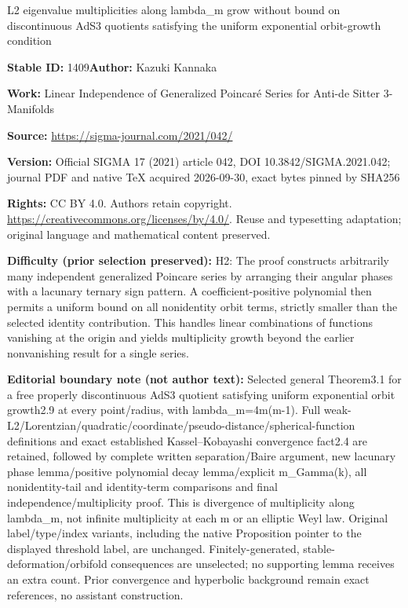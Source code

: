 \documentclass[11pt]{article}
\numberwithin{equation}{section}
\numberwithin{equation}{section}
\begin{document}
\begin{center}\Large L2 eigenvalue multiplicities along lambda\_m grow without bound on discontinuous AdS3 quotients satisfying the uniform exponential orbit-growth condition\end{center}
\noindent\textbf{Stable ID:} 1409\quad\textbf{Author:} Kazuki Kannaka\par
\noindent\textbf{Work:} Linear Independence of Generalized Poincaré Series for Anti-de Sitter 3-Manifolds\par
\noindent\textbf{Source:} \url{https://sigma-journal.com/2021/042/}\par
\noindent\textbf{Version:} Official SIGMA 17 (2021) article 042, DOI 10.3842/SIGMA.2021.042; journal PDF and native TeX acquired 2026-09-30, exact bytes pinned by SHA256\par
\noindent\textbf{Rights:} CC BY 4.0. Authors retain copyright. \url{https://creativecommons.org/licenses/by/4.0/}. Reuse and typesetting adaptation; original language and mathematical content preserved.\par
\noindent\textbf{Difficulty (prior selection preserved):} {\CJKfont H2: The proof constructs arbitrarily many independent generalized Poincare series by arranging their angular phases with a lacunary ternary sign pattern. A coefficient-positive polynomial then permits a uniform bound on all nonidentity orbit terms, strictly smaller than the selected identity contribution. This handles linear combinations of functions vanishing at the origin and yields multiplicity growth beyond the earlier nonvanishing result for a single series.}\par
\medskip\noindent\textbf{Editorial boundary note (not author text):} Selected general Theorem3.1 for a free properly discontinuous AdS3 quotient satisfying uniform exponential orbit growth2.9 at every point/radius, with lambda\_m=4m(m-1). Full weak-L2/Lorentzian/quadratic/coordinate/pseudo-distance/spherical-function definitions and exact established Kassel–Kobayashi convergence fact2.4 are retained, followed by complete written separation/Baire argument, new lacunary phase lemma/positive polynomial decay lemma/explicit m\_Gamma(k), all nonidentity-tail and identity-term comparisons and final independence/multiplicity proof. This is divergence of multiplicity along lambda\_m, not infinite multiplicity at each m or an elliptic Weyl law. Original label/type/index variants, including the native Proposition pointer to the displayed threshold label, are unchanged. Finitely-generated, stable-deformation/orbifold consequences are unselected; no supporting lemma receives an extra count. Prior convergence and hyperbolic background remain exact references, no assistant construction.\par
\end{document}
